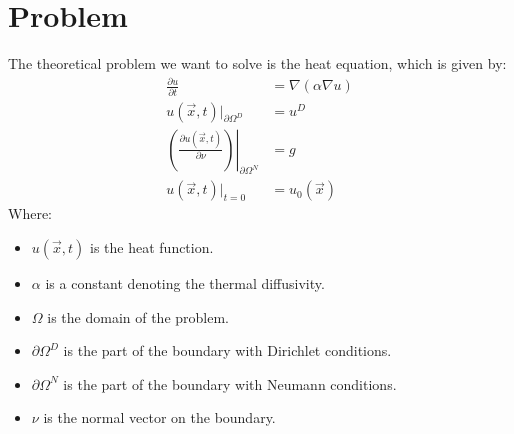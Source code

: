 
\section{\label{sec::problem}Problem}
The theoretical problem we want to solve is the heat equation, which is given by:
\begin{align}
	\frac{\partial u}{\partial t} &= \nabla(\alpha\nabla u) \label{eqn::strongForm}\\
	u(\vec{x},t)|_{\partial\Omega^D} &= u^D \label{eqn::dirichlet}\\
	\left.\left( \frac{\partial u(\vec{x},t)}{\partial \nu}\right)\right|_{\partial\Omega^N} &= g \label{eqn::neumann}\\
	u(\vec{x},t)|_{t=0} &=u_0(\vec{x}) \label{eqn::u_0}
\end{align}
Where:
\begin{itemize}
	\item $u(\vec{x},t)$ is the heat function.
	\item $\alpha$ is a constant denoting the thermal diffusivity.
	\item $\Omega$ is the domain of the problem.
	\item $\partial\Omega^D$ is the part of the boundary with Dirichlet conditions.
	\item $\partial\Omega^N$ is the part of the boundary with Neumann conditions.
	\item $\nu$ is the normal vector on the boundary.
\end{itemize} 